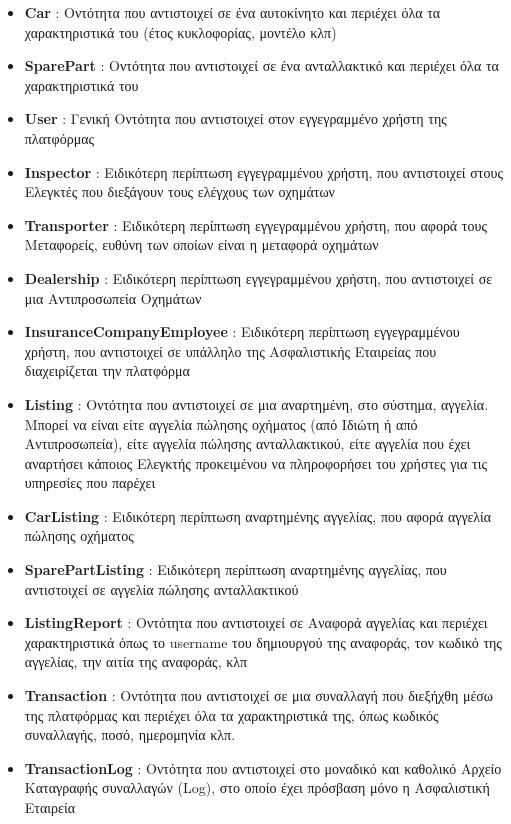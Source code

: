 \documentclass{../ol-softwaremanual}
\begin{document}
	\begin{itemize}
		\item \en \textbf{Car} \gr : Οντότητα που αντιστοιχεί σε ένα αυτοκίνητο και περιέχει όλα τα χαρακτηριστικά του (έτος κυκλοφορίας, μοντέλο κλπ)		
		\item \en \textbf{SparePart} \gr : Οντότητα που αντιστοιχεί σε ένα ανταλλακτικό και περιέχει όλα τα χαρακτηριστικά του
		\item \en \textbf{User} \gr : Γενική Οντότητα που αντιστοιχεί στον εγγεγραμμένο χρήστη της πλατφόρμας
		\item \en \textbf{Inspector} \gr : Ειδικότερη περίπτωση εγγεγραμμένου χρήστη, που αντιστοιχεί στους Ελεγκτές που διεξάγουν τους ελέγχους των οχημάτων
		\item \en \textbf{Transporter} \gr : Ειδικότερη περίπτωση εγγεγραμμένου χρήστη, που αφορά τους Μεταφορείς, ευθύνη των οποίων είναι η μεταφορά οχημάτων
		\item \en \textbf{Dealership} \gr : Ειδικότερη περίπτωση εγγεγραμμένου χρήστη, που αντιστοιχεί σε μια Αντιπροσωπεία Οχημάτων
		\item \en \textbf{InsuranceCompanyEmployee} \gr : Ειδικότερη περίπτωση εγγεγραμμένου χρήστη, που αντιστοιχεί σε υπάλληλο της Ασφαλιστικής Εταιρείας που διαχειρίζεται την πλατφόρμα
		\item \en \textbf{Listing} \gr : Οντότητα που αντιστοιχεί σε μια αναρτημένη, στο σύστημα, αγγελία. Μπορεί να είναι είτε αγγελία πώλησης οχήματος (από Ιδιώτη ή από Αντιπροσωπεία), είτε αγγελία πώλησης ανταλλακτικού, είτε αγγελία που έχει αναρτήσει κάποιος Ελεγκτής προκειμένου να πληροφορήσει του χρήστες για τις υπηρεσίες που παρέχει
		\item \en \textbf{CarListing} \gr : Ειδικότερη περίπτωση αναρτημένης αγγελίας, που αφορά αγγελία πώλησης οχήματος
		\item \en \textbf{SparePartListing} \gr : Ειδικότερη περίπτωση αναρτημένης αγγελίας, που αντιστοιχεί σε αγγελία πώλησης ανταλλακτικού
		\item \en \textbf{ListingReport} \gr : Οντότητα που αντιστοιχεί σε Αναφορά αγγελίας και περιέχει χαρακτηριστικά όπως το \en username \gr του δημιουργού της αναφοράς, τον κωδικό της αγγελίας, την αιτία της αναφοράς, κλπ
		\item \en \textbf{Transaction} \gr : Οντότητα που αντιστοιχεί σε μια συναλλαγή που διεξήχθη μέσω της πλατφόρμας και περιέχει όλα τα χαρακτηριστικά της, όπως κωδικός συναλλαγής, ποσό, ημερομηνία κλπ.
		\item \en \textbf{TransactionLog} \gr : Οντότητα που αντιστοιχεί στο μοναδικό και καθολικό Αρχείο Καταγραφής συναλλαγών (\en Log\gr), στο οποίο έχει πρόσβαση μόνο η Ασφαλιστική Εταιρεία

\end{itemize}
\end{document}
